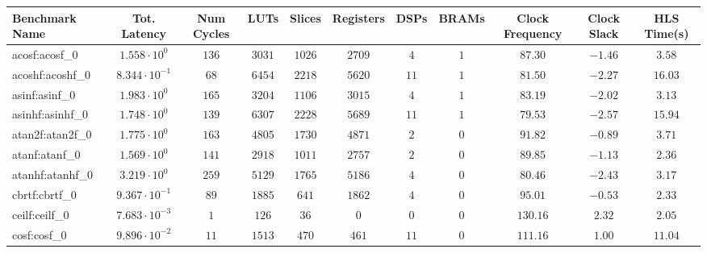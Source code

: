 \begin{tabular}{|l|c|c|c|c|c|c|c|c|c|c|}
\hline
Benchmark Name               & Tot. Latency            & Num Cycles & LUTs       & Slices    & Registers & DSPs    & BRAMs & Clock Frequency & Clock Slack & HLS Time(s) \\
\hline
acosf:acosf\_0               & $ 1.558 \cdot 10^{0}  $ & $ 136    $ & $ 3031   $ & $ 1026  $ & $ 2709  $ & $ 4   $ & $ 1 $ & $ 87.30       $ & $ -1.46   $ & $ 3.58    $ \\
acoshf:acoshf\_0             & $ 8.344 \cdot 10^{-1} $ & $ 68     $ & $ 6454   $ & $ 2218  $ & $ 5620  $ & $ 11  $ & $ 1 $ & $ 81.50       $ & $ -2.27   $ & $ 16.03   $ \\
asinf:asinf\_0               & $ 1.983 \cdot 10^{0}  $ & $ 165    $ & $ 3204   $ & $ 1106  $ & $ 3015  $ & $ 4   $ & $ 1 $ & $ 83.19       $ & $ -2.02   $ & $ 3.13    $ \\
asinhf:asinhf\_0             & $ 1.748 \cdot 10^{0}  $ & $ 139    $ & $ 6307   $ & $ 2228  $ & $ 5689  $ & $ 11  $ & $ 1 $ & $ 79.53       $ & $ -2.57   $ & $ 15.94   $ \\
atan2f:atan2f\_0             & $ 1.775 \cdot 10^{0}  $ & $ 163    $ & $ 4805   $ & $ 1730  $ & $ 4871  $ & $ 2   $ & $ 0 $ & $ 91.82       $ & $ -0.89   $ & $ 3.71    $ \\
atanf:atanf\_0               & $ 1.569 \cdot 10^{0}  $ & $ 141    $ & $ 2918   $ & $ 1011  $ & $ 2757  $ & $ 2   $ & $ 0 $ & $ 89.85       $ & $ -1.13   $ & $ 2.36    $ \\
atanhf:atanhf\_0             & $ 3.219 \cdot 10^{0}  $ & $ 259    $ & $ 5129   $ & $ 1765  $ & $ 5186  $ & $ 4   $ & $ 0 $ & $ 80.46       $ & $ -2.43   $ & $ 3.17    $ \\
cbrtf:cbrtf\_0               & $ 9.367 \cdot 10^{-1} $ & $ 89     $ & $ 1885   $ & $ 641   $ & $ 1862  $ & $ 4   $ & $ 0 $ & $ 95.01       $ & $ -0.53   $ & $ 2.33    $ \\
ceilf:ceilf\_0               & $ 7.683 \cdot 10^{-3} $ & $ 1      $ & $ 126    $ & $ 36    $ & $ 0     $ & $ 0   $ & $ 0 $ & $ 130.16      $ & $ 2.32    $ & $ 2.05    $ \\
cosf:cosf\_0                 & $ 9.896 \cdot 10^{-2} $ & $ 11     $ & $ 1513   $ & $ 470   $ & $ 461   $ & $ 11  $ & $ 0 $ & $ 111.16      $ & $ 1.00    $ & $ 11.04   $ \\

\end{tabular}
